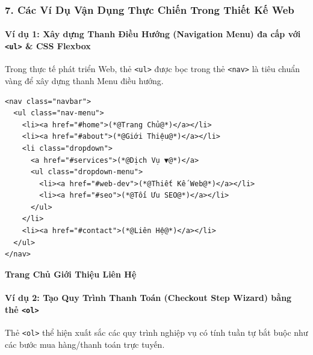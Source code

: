 \documentclass[11pt,oneside]{book}
\newcommand{\codeinline}[1]{\textcolor{accentOrange}{\texttt{#1}}}
\newcommand{\badge}[1]{\tcbox[on line, arc=3pt, colback=primaryBlue!10, colframe=primaryBlue!30, boxsep=1pt, left=3pt, right=3pt, top=1pt, bottom=1pt]{\small\sffamily\color{primaryBlue}#1}}
\begin{document}
\subsubsection{7. Các Ví Dụ Vận Dụng Thực Chiến Trong Thiết Kế Web}

\paragraph{Ví dụ 1: Xây dựng Thanh Điều Hướng (Navigation Menu) đa cấp với \codeinline{<ul>} \& CSS Flexbox}
Trong thực tế phát triển Web, thẻ \codeinline{<ul>} được bọc trong thẻ \codeinline{<nav>} là tiêu chuẩn vàng để xây dựng thanh Menu điều hướng.

\begin{codeWindow}
\begin{lstlisting}[language=HTML5]
<nav class="navbar">
  <ul class="nav-menu">
    <li><a href="#home">(*@Trang Chủ@*)</a></li>
    <li><a href="#about">(*@Giới Thiệu@*)</a></li>
    <li class="dropdown">
      <a href="#services">(*@Dịch Vụ ▼@*)</a>
      <ul class="dropdown-menu">
        <li><a href="#web-dev">(*@Thiết Kế Web@*)</a></li>
        <li><a href="#seo">(*@Tối Ưu SEO@*)</a></li>
      </ul>
    </li>
    <li><a href="#contact">(*@Liên Hệ@*)</a></li>
  </ul>
</nav>
\end{lstlisting}
\end{codeWindow}

\begin{browserWindow}
\begin{tcolorbox}[
    enhanced,
    colback=primaryBlue!5,
    colframe=primaryBlue!30,
    boxrule=0.6pt,
    arc=6pt,
    top=6pt, bottom=6pt, left=10pt, right=10pt
]
\centering\sffamily\bfseries\small
\textcolor{primaryBlue}{Trang Chủ} \qquad
\textcolor{primaryBlue}{Giới Thiệu} \qquad
\badge{Dịch Vụ ▼} \qquad
\textcolor{primaryBlue}{Liên Hệ}
\end{tcolorbox}
\end{browserWindow}

\paragraph{Ví dụ 2: Tạo Quy Trình Thanh Toán (Checkout Step Wizard) bằng thẻ \codeinline{<ol>}}
Thẻ \codeinline{<ol>} thể hiện xuất sắc các quy trình nghiệp vụ có tính tuần tự bắt buộc như các bước mua hàng/thanh toán trực tuyến.
\end{document}

